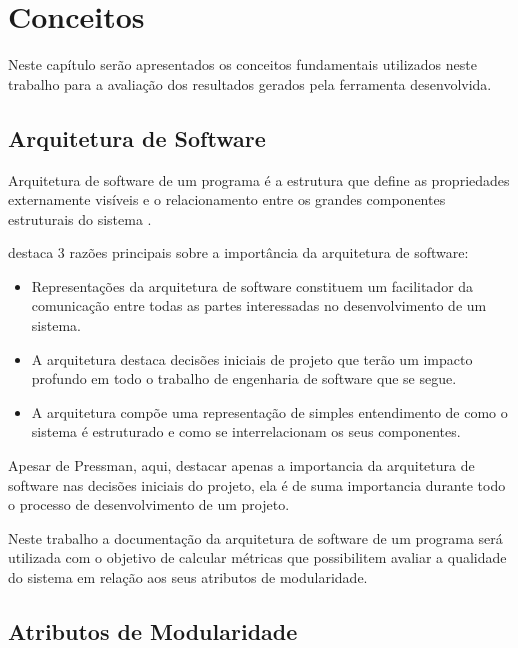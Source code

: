 \chapter{Conceitos} \label{ch:conceitos}

Neste capítulo serão apresentados os conceitos fundamentais utilizados neste
trabalho para a avaliação dos resultados gerados pela ferramenta desenvolvida.

\section{Arquitetura de Software}

Arquitetura de software de um programa é a estrutura que define as propriedades
externamente visíveis e o relacionamento entre os grandes componentes
estruturais do sistema \cite{engenhariaDeSoftwarePressman}.

 destaca 3 razões principais sobre a
importância da arquitetura de software:

\begin{itemize}

\item Representações da arquitetura de software constituem um facilitador da
comunicação entre todas as partes interessadas no desenvolvimento de um
sistema.

\item A arquitetura destaca decisões iniciais de projeto que terão um impacto
profundo em todo o trabalho de engenharia de software que se segue.

\item A arquitetura compõe uma representação de simples entendimento de como o
sistema é estruturado e como se interrelacionam os seus componentes.

\end{itemize}

Apesar de Pressman, aqui, destacar apenas a importancia da arquitetura de
software nas decisões iniciais do projeto, ela é de suma importancia durante
todo o processo de desenvolvimento de um projeto.

Neste trabalho a documentação da arquitetura de software de um programa será
utilizada com o objetivo de calcular métricas que possibilitem avaliar a
qualidade do sistema em relação aos seus atributos de modularidade.

\section{Atributos de Modularidade}

